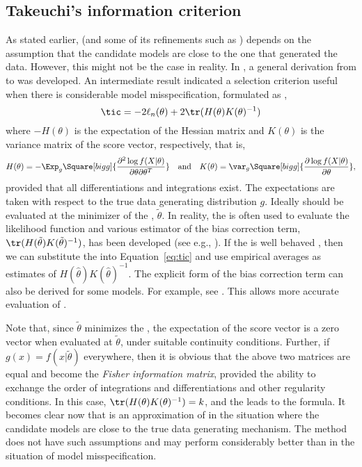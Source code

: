\subsection{Takeuchi's information criterion}
\label{sub:Takeuchi's information criterion}

As stated earlier, \aic (and some of its refinements such as \aicc) depends
on the assumption that the candidate models are close to the one that
generated the data. However, this might not be the case in reality. In
\cite{Takeuchi:1976vx}, a general derivation from \kld to \aic was developed.
An intermediate result indicated a selection criterion useful when there is
considerable model misspecification, formulated as \tic,
\begin{equation}
  \tic = -2\ell_n(\theta) + 2\tr(H(\theta)K(\theta)^{-1})
  \label{eq:tic}
\end{equation}
where $-H(\theta)$ is the expectation of the Hessian matrix and $K(\theta)$
is the variance matrix of the score vector, respectively, that is,
\begin{equation}
  H(\theta) = -\Exp_g\Square[bigg]{
    \frac{\partial^2\log f(X|\theta)}{\partial\theta\partial\theta^T}
  }\quad\text{and}\quad
  K(\theta) = \var_g\Square[bigg]{
    \frac{\partial\log f(X|\theta)}{\partial\theta}
  },
\end{equation}
provided that all differentiations and integrations exist. The expectations
are taken with respect to the true data generating distribution $g$. Ideally
\tic should be evaluated at the minimizer of the \kld, $\tilde\theta$. In
reality, the \mle is often used to evaluate the likelihood function and
various estimator of the bias correction term,
$\tr(H(\tilde\theta)K(\tilde\theta)^{-1})$, has been developed (see e.g.,
\cite{Claeskens:2008tq}). If the \mle is well behaved \cite{Lehmann:1983vx},
then we can substitute the \mle into Equation~\eqref{eq:tic} and use
empirical averages as estimates of $H(\hat\theta)K(\hat\theta)^{-1}$. The
explicit form of the bias correction term can also be derived for some
models. For example, see \cite[][sec.~6.6]{Burnham:2002wc}. This allows more
accurate evaluation of \tic.

Note that, since $\tilde\theta$ minimizes the \kld, the expectation of the
score vector is a zero vector when evaluated at $\tilde\theta$, under
suitable continuity conditions. Further, if $g(x) = f(x|\tilde\theta)$
everywhere, then it is obvious that the above two matrices are equal and
become the \emph{Fisher information matrix}, provided the ability to exchange
the order of integrations and differentiations and other regularity
conditions. In this case, $\tr(H(\theta)K(\theta)^{-1}) = k$, and the \tic
leads to the \aic formula. It becomes clear now that \aic is an approximation
of \tic in the situation where the candidate models are close to the true
data generating mechanism. The \tic method does not have such assumptions and
may perform considerably better than \aic in the situation of model
misspecification.

